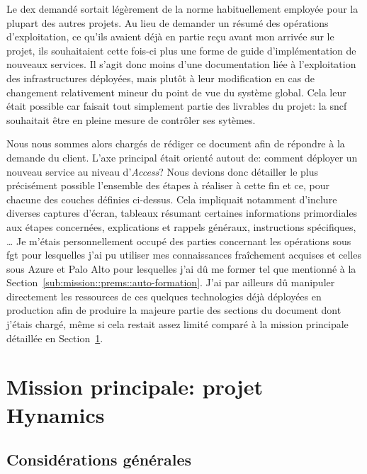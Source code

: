\documentclass[12pt, oneside, a4paper, titlepage]{report}
\begin{document}
Le \gls{dex} demandé sortait légèrement de la norme habituellement employée pour
la plupart des autres projets. Au lieu de demander un résumé des opérations
d'exploitation, ce qu'ils avaient déjà en partie reçu avant mon arrivée sur le
projet, ils souhaitaient cette fois-ci plus une forme de guide d'implémentation
de nouveaux services. Il s'agit donc moins d'une documentation liée à
l'exploitation des infrastructures déployées, mais plutôt à leur modification en
cas de changement relativement mineur du point de vue du système global. Cela
leur était possible car faisait tout simplement partie des livrables du projet:
la \gls{sncf} souhaitait être en pleine mesure de contrôler ses sytèmes.

Nous nous sommes alors chargés de rédiger ce document afin de répondre à la
demande du client. L'axe principal était orienté autout de: comment déployer un
nouveau service au niveau d'\textit{Access}? Nous devions donc détailler le plus
précisément possible l'ensemble des étapes à réaliser à cette fin et ce, pour
chacune des couches définies ci-dessus. Cela impliquait notamment d'inclure
diverses captures d'écran, tableaux résumant certaines informations primordiales
aux étapes concernées, explications et rappels généraux, instructions
spécifiques, \ldots{} Je m'étais personnellement occupé des parties concernant
les opérations sous \acrlong{fgt} pour lesquelles j'ai pu utiliser mes
connaissances fraîchement acquises et celles sous Azure et Palo Alto pour
lesquelles j'ai dû me former tel que mentionné à la
Section~\ref{sub:mission::prems::auto-formation}.  J'ai par ailleurs dû
manipuler directement les ressources de ces quelques technologies déjà déployées
en production afin de produire la majeure partie des sections du document dont
j'étais chargé, même si cela restait assez limité comparé à la mission
principale détaillée en Section~\ref{sec:mission::main}.


\section{Mission principale: projet Hynamics}%
\label{sec:mission::main}

\subsection{Considérations générales}%
\label{sub:mission::main::gen}
\end{document}
